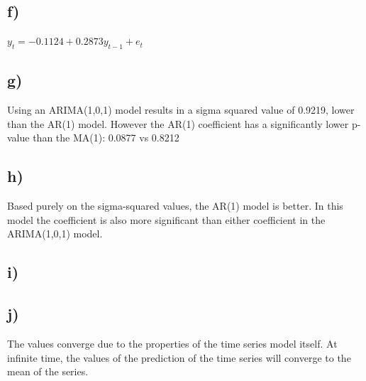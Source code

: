 \documentclass[paper=a4, fontsize=11pt]{scrartcl} %
\numberwithin{equation}{section} %
\numberwithin{figure}{section} %
\numberwithin{table}{section} %
\begin{document}
\subsection*{f)}
$y_t = -0.1124 + 0.2873y_{t-1} + e_t$

\subsection*{g)}
Using an ARIMA(1,0,1) model results in a sigma squared value of 0.9219, lower than the AR(1) model. However the AR(1) coefficient has a significantly lower p-value than the MA(1): 0.0877 vs 0.8212


\subsection*{h)}
Based purely on the sigma-squared values, the AR(1) model is better. In this model the coefficient is also more significant than either coefficient in the ARIMA(1,0,1) model.
\subsection*{i)}


\subsection*{j)}
The values converge due to the properties of the time series model itself. At infinite time, the values of the prediction of the time series will converge to the mean of the series.

\end{document}
